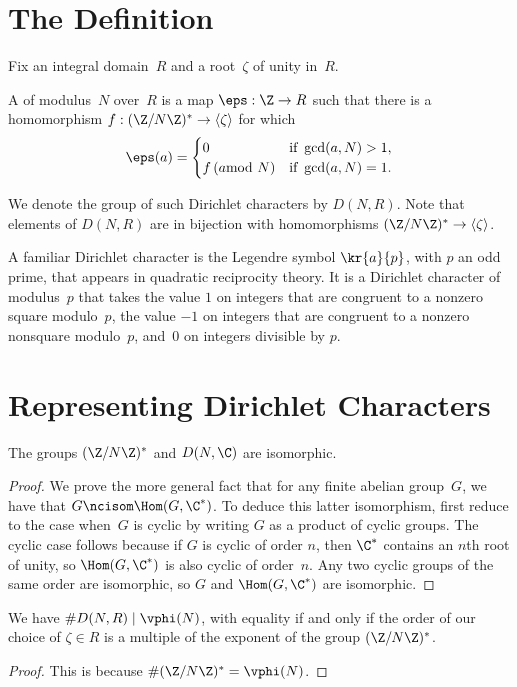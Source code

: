 \section{The Definition}\label{sec:defndir}
Fix an integral domain~$R$ and a root~$\zeta$ of unity in~$R$.
\begin{definition}
  A  of modulus~$N$ over~$R$ is a map
  $\eps:\Z\to R$ such that there is a homomorphism $f:(\Z/N\Z)^* \to
  \langle \zeta \rangle$ for which
$$
 \eps(a) = \begin{cases} 
       0 &\text{if }\gcd(a,N)>1,\\
     f\,(a\!\!\!\!\mod{N}) &\text{if }\gcd(a,N)=1.
   \end{cases}
$$
\end{definition}   
We denote the group of such Dirichlet characters by $D(N,R)$.  Note
that elements of $D(N,R)$ are in bijection with homomorphisms
$(\Z/N\Z)^* \to \langle \zeta \rangle$.

A familiar Dirichlet character is the Legendre symbol
$\kr{a}{p}$, with $p$ an odd prime, that appears in quadratic
reciprocity theory. It is a Dirichlet character of modulus~$p$ that
takes the value $1$ on integers that are congruent to a nonzero square
modulo~$p$, the value $-1$ on integers that are congruent to a nonzero
nonsquare modulo~$p$, and~$0$ on integers divisible by $p$.




\section{Representing Dirichlet Characters}\label{sec:repdir}
\begin{lemma}\label{lem:dual}
  The groups $(\Z/N\Z)^*$ and $D(N,\C)$
  are isomorphic.
\end{lemma}
\begin{proof}
  We prove the more general fact that for any finite abelian
  group~$G$, we have that $G\ncisom \Hom(G,\C^*)$.  To deduce this
  latter  isomorphism, first reduce to the case
  when~$G$ is cyclic by writing $G$ as a product of
cyclic groups. The cyclic case follows
  because if $G$ is cyclic of order $n$, then 
$\C^*$ contains an $n$th root of unity,
 so $\Hom(G,\C^*)$ is also cyclic of order~$n$.  
Any two  cyclic groups of the same order are isomorphic,
so $G$ and $\Hom(G,\C^*)$ are isomorphic.
\end{proof}

\begin{corollary}\label{cor:dir_ord}
We have $\#D(N,R) \mid \vphi(N)$, with equality
if and only if the order of our choice of $\zeta\in R$
is a multiple of the exponent of the group $(\Z/N\Z)^*$.
\end{corollary}
\begin{proof}
This is because $\#(\Z/N\Z)^* = \vphi(N)$.
\end{proof}

